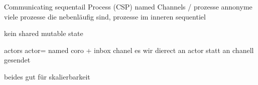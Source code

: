 \documentclass[fontsize=12pt,paper=a4,twoside=semi,parskip=half-,headsepline,headinclude]{scrreprt}
\begin{document}
Communicating sequentail Process (CSP)
named Channels / prozesse annonyme
viele prozesse die nebenläufig sind, prozesse im inneren sequentiel

kein shared mutable state

actors
actor= named coro + inbox chanel
es wir dierect an actor statt an chanell gesendet

beides gut für skalierbarkeit

\printbibliography


%
%
%
%
%
%
%
\end{document}
